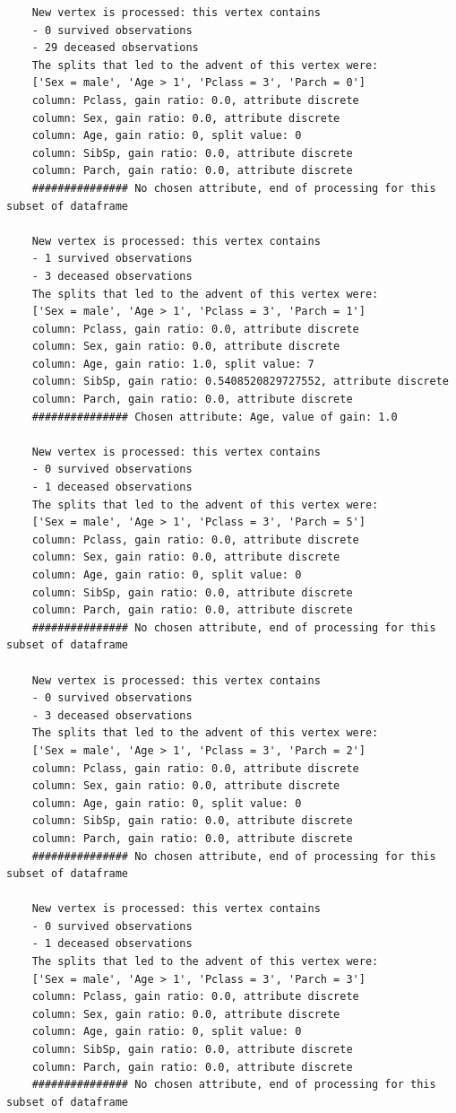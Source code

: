 \documentclass[12pt]{article}
\begin{document}
\begin{verbatim}
	New vertex is processed: this vertex contains
	- 0 survived observations
	- 29 deceased observations
	The splits that led to the advent of this vertex were:
	['Sex = male', 'Age > 1', 'Pclass = 3', 'Parch = 0']
	column: Pclass, gain ratio: 0.0, attribute discrete
	column: Sex, gain ratio: 0.0, attribute discrete
	column: Age, gain ratio: 0, split value: 0
	column: SibSp, gain ratio: 0.0, attribute discrete
	column: Parch, gain ratio: 0.0, attribute discrete
	############### No chosen attribute, end of processing for this subset of dataframe
	
	New vertex is processed: this vertex contains
	- 1 survived observations
	- 3 deceased observations
	The splits that led to the advent of this vertex were:
	['Sex = male', 'Age > 1', 'Pclass = 3', 'Parch = 1']
	column: Pclass, gain ratio: 0.0, attribute discrete
	column: Sex, gain ratio: 0.0, attribute discrete
	column: Age, gain ratio: 1.0, split value: 7
	column: SibSp, gain ratio: 0.5408520829727552, attribute discrete
	column: Parch, gain ratio: 0.0, attribute discrete
	############### Chosen attribute: Age, value of gain: 1.0
	
	New vertex is processed: this vertex contains
	- 0 survived observations
	- 1 deceased observations
	The splits that led to the advent of this vertex were:
	['Sex = male', 'Age > 1', 'Pclass = 3', 'Parch = 5']
	column: Pclass, gain ratio: 0.0, attribute discrete
	column: Sex, gain ratio: 0.0, attribute discrete
	column: Age, gain ratio: 0, split value: 0
	column: SibSp, gain ratio: 0.0, attribute discrete
	column: Parch, gain ratio: 0.0, attribute discrete
	############### No chosen attribute, end of processing for this subset of dataframe
	
	New vertex is processed: this vertex contains
	- 0 survived observations
	- 3 deceased observations
	The splits that led to the advent of this vertex were:
	['Sex = male', 'Age > 1', 'Pclass = 3', 'Parch = 2']
	column: Pclass, gain ratio: 0.0, attribute discrete
	column: Sex, gain ratio: 0.0, attribute discrete
	column: Age, gain ratio: 0, split value: 0
	column: SibSp, gain ratio: 0.0, attribute discrete
	column: Parch, gain ratio: 0.0, attribute discrete
	############### No chosen attribute, end of processing for this subset of dataframe
	
	New vertex is processed: this vertex contains
	- 0 survived observations
	- 1 deceased observations
	The splits that led to the advent of this vertex were:
	['Sex = male', 'Age > 1', 'Pclass = 3', 'Parch = 3']
	column: Pclass, gain ratio: 0.0, attribute discrete
	column: Sex, gain ratio: 0.0, attribute discrete
	column: Age, gain ratio: 0, split value: 0
	column: SibSp, gain ratio: 0.0, attribute discrete
	column: Parch, gain ratio: 0.0, attribute discrete
	############### No chosen attribute, end of processing for this subset of dataframe
	

\end{verbatim}
\end{document}
